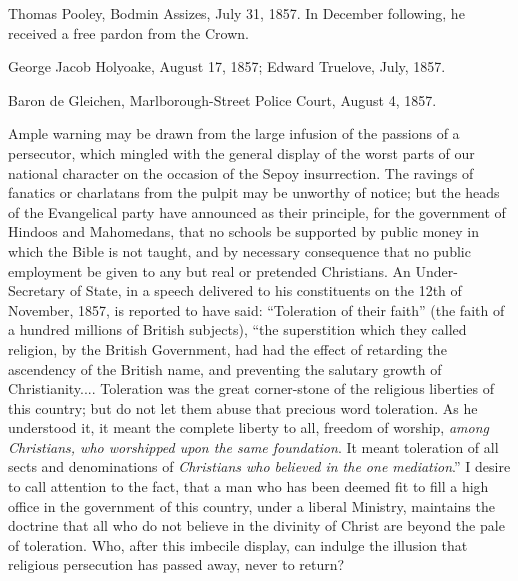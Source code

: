 \begin{readnote}
[7] Thomas Pooley, Bodmin Assizes, July 31, 1857. In December following, he received a free pardon from the Crown.
\end{readnote}

\begin{readnote}
[8] George Jacob Holyoake, August 17, 1857; Edward Truelove, July, 1857.
\end{readnote}

\begin{readnote}
[9] Baron de Gleichen, Marlborough-Street Police Court, August 4, 1857.
\end{readnote}

\begin{readnote}
[10] Ample warning may be drawn from the large infusion of the passions of a persecutor, which mingled with the general display of the worst parts of our national character on the occasion of the Sepoy insurrection. The ravings of fanatics or charlatans from the pulpit may be unworthy of notice; but the heads of the Evangelical party have announced as their principle, for the government of Hindoos and Mahomedans, that no schools be supported by public money in which the Bible is not taught, and by necessary consequence that no public employment be given to any but real or pretended Christians. An Under-Secretary of State, in a speech delivered to his constituents on the 12th of November, 1857, is reported to have said: “Toleration of their faith” (the faith of a hundred millions of British subjects), “the superstition which they called religion, by the British Government, had had the effect of retarding the ascendency of the British name, and preventing the salutary growth of Christianity.... Toleration was the great corner-stone of the religious liberties of this country; but do not let them abuse that precious word toleration. As he understood it, it meant the complete liberty to all, freedom of worship, \textit{among Christians, who worshipped upon the same foundation}. It meant toleration of all sects and denominations of \textit{Christians who believed in the one mediation}.” I desire to call attention to the fact, that a man who has been deemed fit to fill a high office in the government of this country, under a liberal Ministry, maintains the doctrine that all who do not believe in the divinity of Christ are beyond the pale of toleration. Who, after this imbecile display, can indulge the illusion that religious persecution has passed away, never to return?
\end{readnote}

\endgroup

